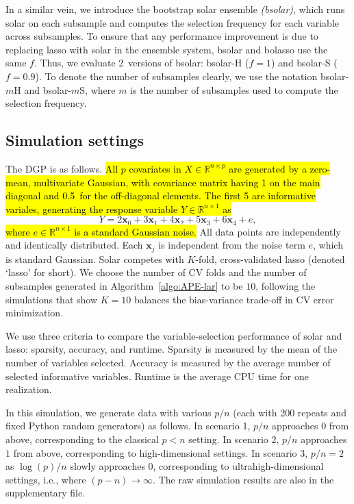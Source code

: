 \documentclass[11pt,review,authoryear]{elsarticle}
\begin{document}
In a similar vein, we introduce the bootstrap solar ensemble \emph{(bsolar)}, which runs solar on each subsample and computes the selection frequency for each variable across subsamples. To ensure that any performance improvement is due to replacing lasso with solar in the ensemble system, bsolar and bolasso use the same $f$. Thus, we evaluate 2~versions of bsolar: bsolar-H ($f=1$) and bsolar-S ($f=0.9$). To denote the number of subsamples clearly, we use the notation bsolar-$m$H and bsolar-$m$S, where $m$ is the number of subsamples used to compute the selection frequency.

\subsection{Simulation settings}

The DGP is as follows. \hl{All $p$ covariates in $X \in \mathbb{R}^{n \times p}$ are generated by a zero-mean, multivariate Gaussian, with covariance matrix having 1 on the main diagonal and 0.5~for the off-diagonal elements. The first 5 are informative variales, generating the response variable $Y \in \mathbb{R}^{n \times 1}$ as}
%
\begin{equation}
%
  Y =  2 \mathbf{x}_0 + 3 \mathbf{x}_1 + 4 \mathbf{x}_2 + 5 \mathbf{x}_3 + 6 \mathbf{x}_4  + e,
  \label{eqn:pop_model}
\end{equation}
%
\hl{where $e\in \mathbb{R}^{n \times 1}$ is a standard Gaussian noise.} All data points are independently and identically distributed. Each $\mathbf{x}_j$ is independent from the noise term $e$, which is standard Gaussian. Solar competes with $K$-fold, cross-validated lasso (denoted `lasso' for short). We choose the number of CV folds and the number of subsamples generated in Algorithm~\ref{algo:APE-lar} to be $10$, following the \citet{friedman2001elements} simulations that show $K = 10$ balances the bias-variance trade-off in CV error minimization.

We use three criteria to compare the variable-selection performance of solar and lasso: sparsity, accuracy, and runtime. Sparsity is measured by the mean of the number of variables selected. Accuracy is measured by the average number of selected informative variables. Runtime is the average CPU time for one realization.

In this simulation, we generate data with various $p/n$ (each with 200 repeats and fixed Python random generators) as follows. In scenario 1, $p/n$ approaches $0$ from above, corresponding to the classical $p<n$ setting. In scenario 2, $p/n$ approaches $1$ from above, corresponding to high-dimensional settings. In scenario 3, $p/n=2$ as $\log(p)/n$ slowly approaches $0$, corresponding to ultrahigh-dimensional settings, i.e., where $(p-n)\rightarrow\infty$. The raw simulation results are also in the supplementary file.
\end{document}
